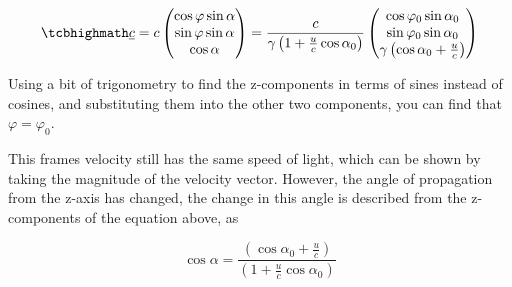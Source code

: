 \begin{equation}
	\label{eq: velocity transform for light}
	\mhl{
		\underline{c} = c
		\begin{pmatrix}
			\cos\varphi\sin\alpha \\
			\sin\varphi\sin\alpha \\
			\cos\alpha            \\
		\end{pmatrix}
		=
		\dfrac{c}{{\gamma}\left(1+\frac{u}{c} \cos\alpha_0\right) }
		\begin{pmatrix}
			\cos\varphi_0\sin\alpha_0                        \\
			\sin\varphi_0\sin\alpha_0                        \\
			{\gamma} \left( \cos\alpha_0+\frac{u}{c} \right) \\
		\end{pmatrix}
	}
\end{equation}

Using a bit of trigonometry to find the z-components in terms of sines instead of cosines, and substituting them into the other two components, you can find that $\varphi=\varphi_0$.



This frames velocity still has the same speed of light, which can be shown by taking the magnitude of the velocity vector.
However, the angle of propagation from the z-axis has changed, the change in this angle is described from the z-components of the equation above, as

\begin{equation}
	\label{eq: cosine transform}
	\cos\alpha = \dfrac{ \left( \cos\alpha_0+\frac{u}{c} \right)}{\left(1+\frac{u}{c} \cos\alpha_0\right) }
\end{equation}

